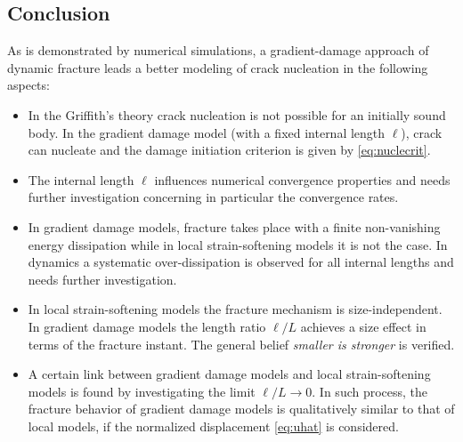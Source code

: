 \subsection*{Conclusion}
As is demonstrated by numerical simulations, a gradient-damage approach of dynamic fracture leads a better modeling of crack nucleation in the following aspects:
\begin{itemize}
\item In the Griffith's theory crack nucleation is not possible for an initially sound body. In the gradient damage model (with a fixed internal length $\ell$), crack can nucleate and the damage initiation criterion is given by \eqref{eq:nuclecrit}.

\item The internal length $\ell$ influences numerical convergence properties and needs further investigation concerning in particular the convergence rates.

\item In gradient damage models, fracture takes place with a finite non-vanishing energy dissipation while in local strain-softening models it is not the case. In dynamics a systematic over-dissipation is observed for all internal lengths and needs further investigation.

\item In local strain-softening models the fracture mechanism is size-independent. In gradient damage models the length ratio $\ell/L$ achieves a size effect in terms of the fracture instant. The general belief \emph{smaller is stronger} is verified.

\item A certain link between gradient damage models and local strain-softening models is found by investigating the limit $\ell/L\to 0$. In such process, the fracture behavior of gradient damage models is qualitatively similar to that of local models, if the normalized displacement \eqref{eq:uhat} is considered.
\end{itemize}

